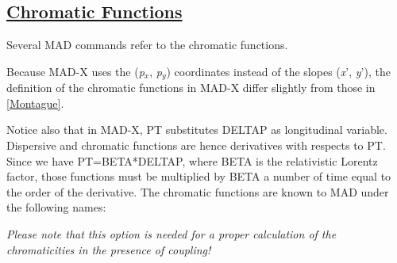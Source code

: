 \subsection{\href{chrom}{Chromatic Functions}} 
Several MAD commands refer to the chromatic functions. 

Because MAD-X uses the (\textit{p$_x$}, \textit{p$_y$}) coordinates
instead of the slopes (\textit{x}', \textit{y}'), the definition of the
chromatic functions in MAD-X differ slightly from those in
\href{bibliography.html#montague}{[Montague]}.  

Notice also that in MAD-X, PT substitutes DELTAP as longitudinal
variable. Dispersive and chromatic functions are hence derivatives with
respects to PT. Since we have PT=BETA*DELTAP, where BETA is the
relativistic Lorentz factor, those functions must be multiplied by BETA
a number of time equal to the order of the derivative. The chromatic
functions are known to MAD under the following names:  

\textit{Please note that this option is needed for a proper calculation
  of the chromaticities in the presence of coupling!} 

